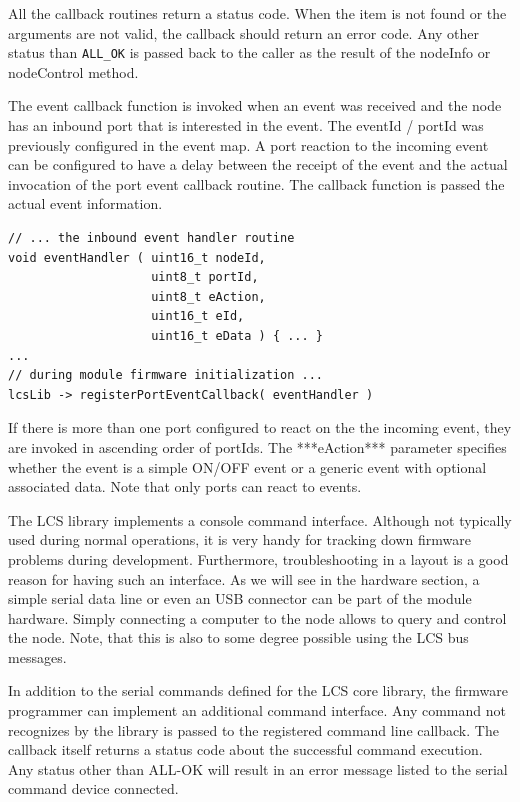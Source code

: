 All the callback routines return a status code. When the item is not found or the arguments are not valid, the callback should return an error code. Any other status than \texttt{ALL\_OK} is passed back to the caller as the result of the nodeInfo or nodeControl method.


The event callback function is invoked when an event was received and the node has an inbound port that is interested in the event. The eventId / portId was previously configured in the event map. A port reaction to the incoming event can be configured to have a delay between the receipt of the event and the actual invocation of the port event callback routine. The callback function is passed the actual event information.

\lstset{style=codesnippetstyle}
\begin{lstlisting}
// ... the inbound event handler routine
void eventHandler ( uint16_t nodeId, 
                    uint8_t portId, 
                    uint8_t eAction,
                    uint16_t eId, 
                    uint16_t eData ) { ... }
...
// during module firmware initialization ...
lcsLib -> registerPortEventCallback( eventHandler )
\end{lstlisting}

If there is more than one port configured to react on the the incoming event, they are invoked in ascending order of portIds. The ***eAction*** parameter specifies whether the event is a simple ON/OFF event or a generic event with optional associated data. Note that only ports can react to events.


The LCS library implements a console command interface. Although not typically used during normal operations, it is very handy for tracking down firmware problems during development. Furthermore, troubleshooting in a layout is a good reason for having such an interface. As we will see in the hardware section, a simple serial data line or even an USB connector can be part of the module hardware. Simply connecting a computer to the node allows to query and control the node. Note, that this is also to some degree possible using the LCS bus messages.

In addition to the serial commands defined for the LCS  core library, the firmware programmer can implement an additional command interface. Any command not recognizes by the library is passed to the registered command line callback. The callback itself returns a status code about the successful command execution. Any status other than ALL-OK will result in an error message listed to the serial command device connected.

